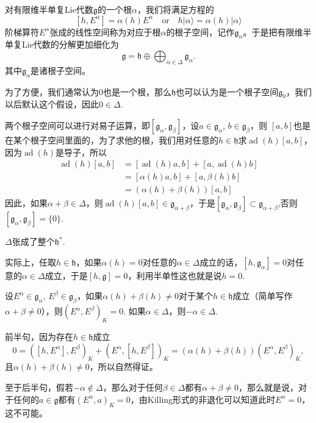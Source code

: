 \documentclass[11pt]{article}
\theoremstyle{definition}
\theoremstyle{plain}
\newcommand{\lag}{{\mathfrak{g}}}
\DeclareMathOperator{\ad}{ad}
\begin{document}
\para 对有限维半单复Lie代数$\lag$的一个根$\alpha$，我们将满足方程的
\[
	[h,E^\alpha]=\alpha(h)E^\alpha\quad\text{or}\quad h|\alpha\rangle=\alpha(h)|\alpha\rangle
\]
阶梯算符$E^\alpha$张成的线性空间称为对应于根$\alpha$的根子空间，记作$\lag_{\alpha}$。于是把有限维半单复Lie代数的分解更加细化为
\[
	\lag=\mathfrak{h}\oplus \bigoplus_{\alpha\in\Delta} \lag_\alpha.
\]
其中$\lag_\alpha$是诸根子空间。

为了方便，我们通常认为$0$也是一个根，那么$\mathfrak{h}$也可以认为是一个根子空间$\lag_0$，我们以后默认这个假设，因此$0\in\Delta$.

\para 两个根子空间可以进行对易子运算，即$[\lag_\alpha,\lag_\beta]$，设$a\in\lag_\alpha$, $b\in\lag_\beta$，则
$[a,b]$也是在某个根子空间里面的，为了求他的根，我们用对任意的$h\in \mathfrak{h}$求$\ad(h)[a,b]$，因为$\ad(h)$是导子，所以
\[
	\begin{split}
		\ad(h)[a,b]&=[\ad(h)a,b]+[a,\ad(h)b]\\
		&=[\alpha(h)a,b]+[a,\beta(h)b]\\
		&=(\alpha(h)+\beta(h))[a,b]
	\end{split}
\]
因此，如果$\alpha+\beta\in\Delta$，则$\ad(h)[a,b]\in \lag_{\alpha+\beta}$，于是$[\lag_\alpha,\lag_\beta]\subset \lag_{\alpha+\beta}$,否则$[\lag_\alpha,\lag_\beta]=\{0\}$.

{\pro $\Delta$张成了整个$\mathfrak{h}^*$.\endpro}

\proof 实际上，任取$h\in \mathfrak{h}$，如果$\alpha(h)=0$对任意的$\alpha\in \Delta$成立的话，$[h,\lag_{\alpha}]=0$对任意的$\alpha\in \Delta$成立，于是$[h,\lag]=0$，利用半单性这也就是说$h=0$.\endproof

{\pro 设$E^\alpha\in\lag_\alpha$, $E^\beta\in\lag_\beta$，如果$\alpha(h)+\beta(h)\neq 0$对于某个$h\in \mathfrak{h}$成立（简单写作$\alpha+\beta\neq 0$），则$(E^\alpha,E^\beta)_K=0$. 如果$\alpha\in\Delta$，则$-\alpha\in\Delta$.\endpro}

\proof 前半句，因为存在$h\in\mathfrak{h}$成立
\[
	0=([h,E^\alpha],E^\beta)_K+(E^\alpha,[h,E^\beta])_K=(\alpha(h)+\beta(h))(E^\alpha,E^\beta)_K,
\]
且$\alpha(h)+\beta(h)\neq 0$，所以自然得证。

至于后半句，假若$-\alpha\notin\Delta$，那么对于任何$\beta\in\Delta$都有$\alpha+\beta\neq 0$，那么就是说，对于任何的$a\in \lag$都有$(E^\alpha,a)_K=0$，由Killing形式的非退化可以知道此时$E^\alpha=0$，这不可能。\endproof

\end{document}
